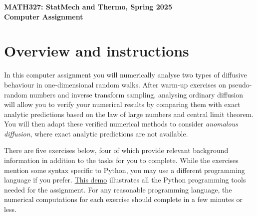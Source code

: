 \documentclass[12 pt]{article} %
\begin{document}
\newcommand{\thisunit}{MATH327 Comp.~Assign.}
\newcommand{\moddate}{Last modified 24 Jan.~2025}
\begin{center}
  {\Large \textbf{MATH327: StatMech and Thermo, Spring 2025}} \\[12 pt]
  {\Large \textbf{Computer Assignment}} \\[24 pt]
\end{center}

\section*{Overview and instructions}
In this computer assignment you will numerically analyse two types of diffusive behaviour in one-dimensional random walks.
After warm-up exercises on pseudo-random numbers and inverse transform sampling, analysing ordinary diffusion will allow you to verify your numerical results by comparing them with exact analytic predictions based on the law of large numbers and central limit theorem.
You will then adapt these verified numerical methods to consider \textit{anomalous diffusion}, where exact analytic predictions are not available.

There are five exercises below, four of which provide relevant background information in addition to the tasks for you to complete.
While the exercises mention some syntax specific to Python, you may use a different programming language if you prefer.
\href{https://tinyurl.com/math327demo}{This demo} illustrates all the Python programming tools needed for the assignment.
For any reasonable programming language, the numerical computations for each exercise should complete in a few minutes or less.
\end{document}
